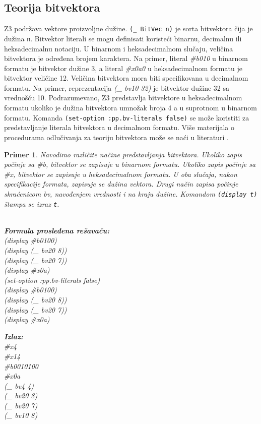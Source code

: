 \documentclass[12pt,oneside]{memoir}
\newtheorem{primer}{Primer}
\begin{document}
\subsection{Teorija bitvektora} 
Z3 podržava vektore proizvoljne dužine. \texttt{(\_ BitVec n)} je sorta bitvektora čija je dužina \texttt{n}. Bitvektor literali se mogu definisati koristeći binarnu, decimalnu ili heksadecimalnu notaciju. U binarnom i heksadecimalnom slučaju, veličina bitvektora je određena brojem karaktera. Na primer, literal \textit{\#b010} u binarnom formatu je bitvektor dužine 3, a literal \textit{\#x0a0} u heksadecimalnom formatu je bitvektor veličine 12. Veličina bitvektora mora biti specifikovana u decimalnom formatu. Na primer, reprezentacija \textit{(\_ bv10 32)} je bitvektor dužine 32 sa vrednošću 10. Podrazumevano, Z3 predstavlja bitvektore u heksadecimalnom formatu ukoliko je dužina bitvektora umnožak broja 4 a u suprotnom u binarnom formatu. Komanda 
\texttt{(set-option :pp.bv-literals false)} se može koristiti za predstavljanje literala bitvektora u decimalnom formatu. Više materijala o procedurama odlučivanja za teoriju bitvektora može se naći u literaturi \cite{DPBitvector}.
\begin{primer} Navodimo različite načine predstavljanja bitvektora. Ukoliko zapis počinje sa \#b, bitvektor se zapisuje u binarnom formatu. Ukoliko zapis počinje sa \#x, bitvektor se zapisuje u heksadecimalnom formatu. U oba slučaja, nakon specifikacije formata, zapisuje se dužina vektora. Drugi način zapisa počinje skraćenicom bv, navođenjem vrednosti i na kraju dužine. Komandom \texttt{(display t)} štampa se izraz \texttt{t}.\\\\
\begin{minipage}[b]{0.45\textwidth}
\textbf{Formula prosleđena rešavaču:}
\\(display \#b0100)
\\(display (\_ bv20 8))
\\(display (\_ bv20 7))
\\(display \#x0a) 
\\(set-option :pp.bv-literals false)
\\(display \#b0100)
\\(display (\_ bv20 8))
\\(display (\_ bv20 7))
\\(display \#x0a)
\end{minipage}
\hspace{2.5cm}
\begin{minipage}[t]{0.4\textwidth}
\vspace{-5.9cm}
\textbf{Izlaz:}
\\\#x4 
\\\#x14 
\\\#b0010100 
\\\#x0a 
\\(\_ bv4 4) 
\\(\_ bv20 8) 
\\(\_ bv20 7) 
\\(\_ bv10 8)
\end{minipage}
\end{primer}
\end{document}
